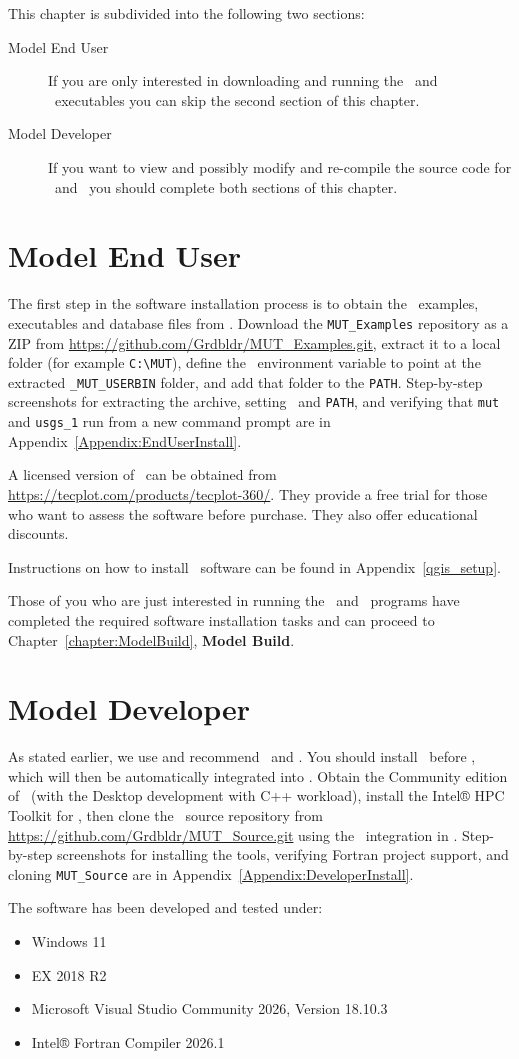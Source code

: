 \label{chapter:Installation}
This chapter is subdivided into the following two sections:
\begin{description}
    \item[Model End User] If you are only interested in downloading and running the \mut\ and \mfus\ executables you can skip the second section of this chapter.
    \item[Model Developer] If you want to view and possibly modify and re-compile the source code for \mut\ and \mfus\ you should complete both sections of this chapter.
\end{description}

\section{Model End User}
The first step in the software installation process is to obtain the \mut\ examples, executables and database files from
\github. Download the \texttt{MUT\_Examples} repository as a ZIP from
\url{https://github.com/Grdbldr/MUT_Examples.git}, extract it to a local folder (for example \verb+C:\MUT+),
define the \bin\ environment variable to point at the extracted \texttt{\_MUT\_USERBIN} folder, and add that folder to the \texttt{PATH}.
Step-by-step screenshots for extracting the archive, setting \bin\ and \texttt{PATH}, and verifying that \texttt{mut} and \texttt{usgs\_1} run from a new command prompt are in Appendix~\ref{Appendix:EndUserInstall}.

A licensed version of \tecplot\ can be obtained from \url{https://tecplot.com/products/tecplot-360/}.  They provide a free trial for those who want to assess the software before purchase.  They also offer educational discounts.

Instructions on how to install \qgis\ software can be found in Appendix~\ref{qgis_setup}.

Those of you who are just interested in running the \mut\ and \mfus\ programs have completed the required  software installation tasks and can proceed to Chapter~\ref{chapter:ModelBuild}, \textbf{Model Build}.


\section{Model Developer}
As stated earlier, we use and recommend \vstudio\ and \ifort. You should install \vstudio\ before \ifort, which will then be automatically integrated into \vstudio.
Obtain the Community edition of \vstudio\ (with the {\sf Desktop development with C++} workload), install the Intel® HPC Toolkit for \ifort, then clone the \mut\ source repository from
\url{https://github.com/Grdbldr/MUT_Source.git} using the \github\ integration in \vstudio.
Step-by-step screenshots for installing the tools, verifying Fortran project support, and cloning \texttt{MUT\_Source} are in Appendix~\ref{Appendix:DeveloperInstall}.

The software has been developed and tested under:
\begin{itemize}
    \item Windows 11
    \item {} EX 2018 R2
    \item Microsoft Visual Studio Community 2026, Version 18.10.3
    \item Intel® Fortran Compiler 2026.1
\end{itemize}
